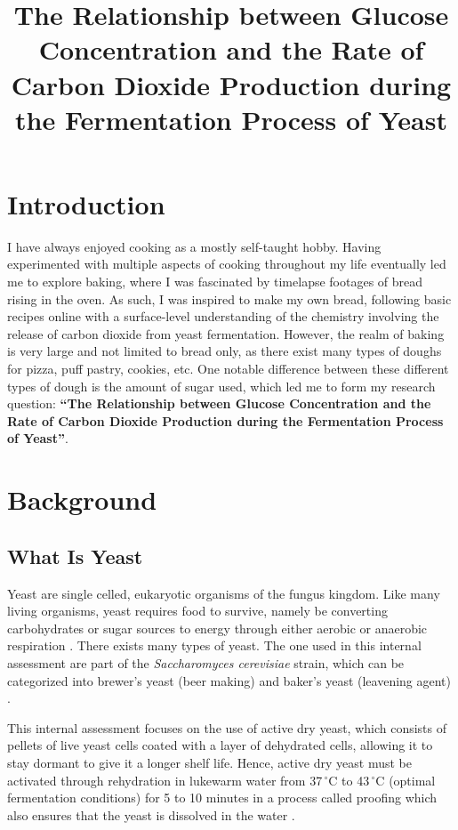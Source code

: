 \documentclass[12pt]{article}
\title{\textbf{The Relationship between Glucose Concentration and the Rate of Carbon Dioxide Production during the Fermentation Process of Yeast}}
\author{}
\date{}
\begin{document}
\maketitle
\newpage
{}

\section{Introduction}
I have always enjoyed cooking as a mostly self-taught hobby. Having experimented with multiple aspects of cooking throughout my life eventually led me to explore baking, where I was fascinated by timelapse footages of bread rising in the oven. As such, I was inspired to make my own bread, following basic recipes online with a surface-level understanding of the chemistry involving the release of carbon dioxide from yeast fermentation. However, the realm of baking is very large and not limited to bread only, as there exist many types of doughs for pizza, puff pastry, cookies, etc. One notable difference between these different types of dough is the amount of sugar used, which led me to form my research question: \textbf{``The Relationship between Glucose Concentration and the Rate of Carbon Dioxide Production during the Fermentation Process of Yeast''}.

\section{Background}

\subsection{What Is Yeast}
Yeast are single celled, eukaryotic organisms of the fungus kingdom. Like many living organisms, yeast requires food to survive, namely be converting carbohydrates or sugar sources to energy through either aerobic or anaerobic respiration \parencite{ref}. There exists many types of yeast. The one used in this internal assessment are part of the \emph{Saccharomyces cerevisiae} strain, which can be categorized into brewer's yeast (beer making) and baker's yeast (leavening agent) \parencite{ref}.

\medskip

This internal assessment focuses on the use of active dry yeast, which consists of pellets of live yeast cells coated with a layer of dehydrated cells, \parencite{ref} allowing it to stay dormant to give it a longer shelf life. Hence, active dry yeast must be activated through rehydration in lukewarm water from 37$\,^{\circ}$C to 43$\,^{\circ}$C (optimal fermentation conditions) for 5 to 10 minutes in a process called proofing which also ensures that the yeast is dissolved in the water \parencite{ref}.
\end{document}
